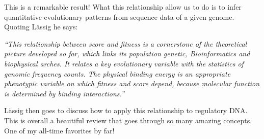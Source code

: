 This is a remarkable result! What this relationship allow us to do is to infer
quantitative evolutionary patterns from sequence data of a given genome. Quoting
L\"{a}ssig he says:

{\it  ``This relationship between score and fitness is a cornerstone of the
theoretical picture developed so far, which links its population genetic,
Bioinformatics and biophysical arches. It relates a key evolutionary variable
with the statistics of genomic frequency counts. The physical binding energy is
an appropriate phenotypic variable on which fitness and score depend, because
molecular function is determined by binding interactions.''}

L\"{a}ssig then goes to discuss how to apply this relationship to regulatory DNA.
This is overall a beautiful review that goes through so many amazing concepts.
One of my all-time favorites by far!
